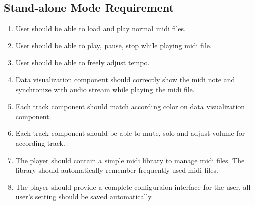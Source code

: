 \subsection{Stand-alone Mode Requirement}
\begin{enumerate}
  \item User should be able to load and play normal midi files.
  \item User should be able to play, pause, stop while playing midi file.  
  \item User should be able to freely adjust tempo.  
  \item Data visualization component should correctly show the midi note 
    and synchronize with audio stream while playing the midi file.
  \item Each track component should match according color on data visualization component.
  \item Each track component should be able to mute, solo and adjust volume 
        for according track.  
  \item The player should contain a simple midi library to manage midi files. 
        The library should automatically remember frequently used midi files.
  \item The player should provide a complete configuraion interface for the 
        user, all user's setting should be saved automatically.
\end{enumerate}


